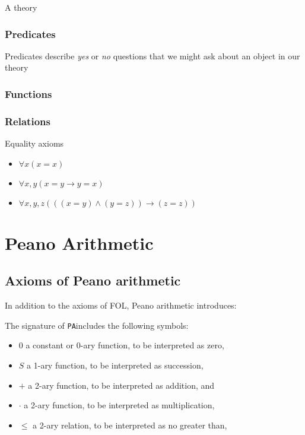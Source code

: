 \documentclass[10pt]{article}
\newcommand{\PA}{\texttt{PA}}
\begin{document}
	A theory
	
	\subsubsection{Predicates}
	
	Predicates describe \emph{yes} or \emph{no} questions that we might ask about an object in our theory
	
	\subsubsection{Functions}	
	\subsubsection{Relations}
	
	Equality axioms
	
	\begin{tcolorbox}[colback=green!5!white,colframe=green!75!black,title={\bf Axioms of equality}]
		\begin{itemize}[itemsep=0pt]
			\item $\forall x (x = x)$
			\item $\forall x, y (x=y \to y=x)$
			\item $\forall x, y, z (((x=y) \land (y=z)) \to (z=z))$
		\end{itemize}
	\end{tcolorbox}
	
	\section{Peano Arithmetic}
	
	\subsection{Axioms of Peano arithmetic}
	In addition to the axioms of FOL, Peano arithmetic introduces:
	
	The signature of \PA includes the following symbols:
	\begin{itemize}
		\item $0$ a constant or 0-ary function, to be interpreted as zero,
		\item $S$ a 1-ary function, to be interpreted as succession,
		\item $+$ a 2-ary function, to be interpreted as addition, and
		\item $\cdot$ a 2-ary function, to be interpreted as multiplication,
		\item $\le$ a 2-ary relation, to be interpreted as no greater than,
	\end{itemize}
	
\end{document}
